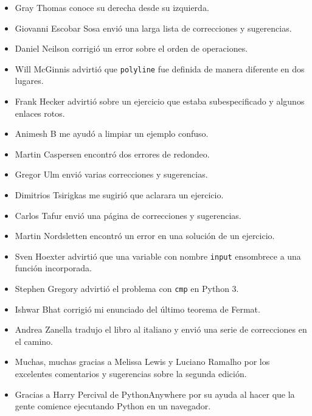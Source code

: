 \documentclass[10pt]{book}
\begin{document}
\begin{itemize}
\item Gray Thomas conoce su derecha desde su izquierda.

\item Giovanni Escobar Sosa envió una larga lista de correcciones y
sugerencias.

\item Daniel Neilson corrigió un error sobre el orden de operaciones.

\item Will McGinnis advirtió que {\tt polyline} fue definida
de manera diferente en dos lugares.

\item Frank Hecker advirtió sobre un ejercicio que estaba subespecificado y
algunos enlaces rotos.

\item Animesh B me ayudó a limpiar un ejemplo confuso.

\item Martin Caspersen encontró dos errores de redondeo.

\item Gregor Ulm envió varias correcciones y sugerencias.

\item Dimitrios Tsirigkas me sugirió que aclarara un ejercicio.

\item Carlos Tafur envió una página de correcciones y sugerencias.

\item Martin Nordsletten encontró un error en una solución de un ejercicio.

\item Sven Hoexter advirtió que una variable con nombre {\tt input}
ensombrece a una función incorporada.

\item Stephen Gregory advirtió el problema con {\tt cmp}
en Python 3.

\item Ishwar Bhat corrigió mi enunciado del último teorema de Fermat.

\item Andrea Zanella tradujo el libro al italiano y envió una
serie de correcciones en el camino.

\item Muchas, muchas gracias a Melissa Lewis y Luciano Ramalho por
  los excelentes comentarios y sugerencias sobre la segunda edición.

\item Gracias a Harry Percival de PythonAnywhere por su ayuda
al hacer que la gente comience ejecutando Python en un navegador.


\end{itemize}
\end{document}
